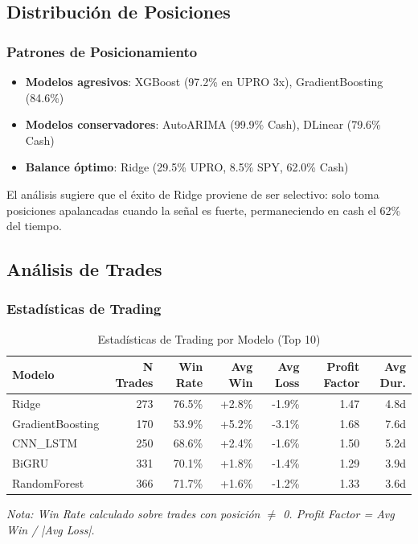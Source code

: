 \subsection{Distribuci\'on de Posiciones}
\label{subsec:position_distribution}



\subsubsection{Patrones de Posicionamiento}

\begin{itemize}
    \item \textbf{Modelos agresivos}: XGBoost (97.2\% en UPRO 3x), GradientBoosting (84.6\%)
    \item \textbf{Modelos conservadores}: AutoARIMA (99.9\% Cash), DLinear (79.6\% Cash)
    \item \textbf{Balance \'optimo}: Ridge (29.5\% UPRO, 8.5\% SPY, 62.0\% Cash)
\end{itemize}

El an\'alisis sugiere que el \'exito de Ridge proviene de ser selectivo: solo toma posiciones apalancadas cuando la se\~nal es fuerte, permaneciendo en cash el 62\% del tiempo.

\subsection{An\'alisis de Trades}
\label{subsec:trade_analysis}

\subsubsection{Estad\'isticas de Trading}

\begin{table}[htbp]
\centering
\caption{Estad\'isticas de Trading por Modelo (Top 10)}
\label{tab:trading_stats}
\small
\begin{tabular}{@{}lrrrrrr@{}}
\toprule
\textbf{Modelo} & \textbf{N Trades} & \textbf{Win Rate} & \textbf{Avg Win} & \textbf{Avg Loss} & \textbf{Profit Factor} & \textbf{Avg Dur.} \\
\midrule
Ridge & 273 & 76.5\% & +2.8\% & -1.9\% & 1.47 & 4.8d \\
GradientBoosting & 170 & 53.9\% & +5.2\% & -3.1\% & 1.68 & 7.6d \\
CNN\_LSTM & 250 & 68.6\% & +2.4\% & -1.6\% & 1.50 & 5.2d \\
BiGRU & 331 & 70.1\% & +1.8\% & -1.4\% & 1.29 & 3.9d \\
RandomForest & 366 & 71.7\% & +1.6\% & -1.2\% & 1.33 & 3.6d \\
\bottomrule
\end{tabular}
\vspace{0.2cm}
\small\textit{
\small
Nota: Win Rate calculado sobre trades con posici\'on $\neq$ 0. Profit Factor = Avg Win / |Avg Loss|.}
\end{table}

